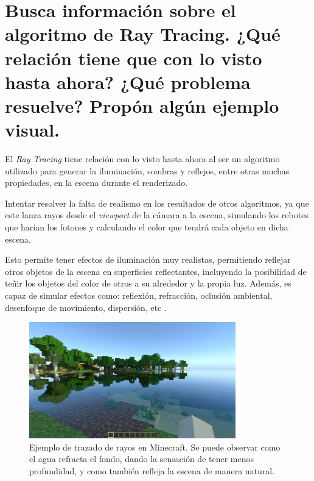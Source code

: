 \documentclass{article}
\begin{document}
\section{Busca información sobre el algoritmo de Ray Tracing. ¿Qué relación tiene que con lo visto hasta ahora? ¿Qué problema resuelve? Propón algún ejemplo visual.}

El \textit{Ray Tracing} tiene relación con lo visto hasta ahora al ser un algoritmo utilizado para generar la iluminación, sombras y reflejos, entre otras muchas propiedades, en la escena durante el renderizado.

\bigskip

Intentar resolver la falta de realismo en los resultados de otros algoritmos, ya que este lanza rayos desde el \textit{viewport} de la cámara a la escena, simulando los rebotes que harían los fotones y calculando el color que tendrá cada objeto en dicha escena. 

\bigskip

Esto permite tener efectos de iluminación muy realistas, permitiendo reflejar otros objetos de la escena en superficies reflectantes, incluyendo la posibilidad de teñir los objetos del color de otros a su alrededor y la propia luz. Además, es capaz de simular efectos como: reflexión, refracción, oclusión ambiental, desenfoque de movimiento, dispersión, etc \cite{raytracing}. 

\begin{figure}[H]
    \centering
    \includegraphics[width=0.8\textwidth]{imagenes/minecraft1.jpg}
    \caption{Ejemplo de trazado de rayos en Minecraft. Se puede observar como el agua refracta el fondo, dando la sensación de tener menos profundidad, y como también refleja la escena de manera natural.}
 \end{figure}
\end{document}
